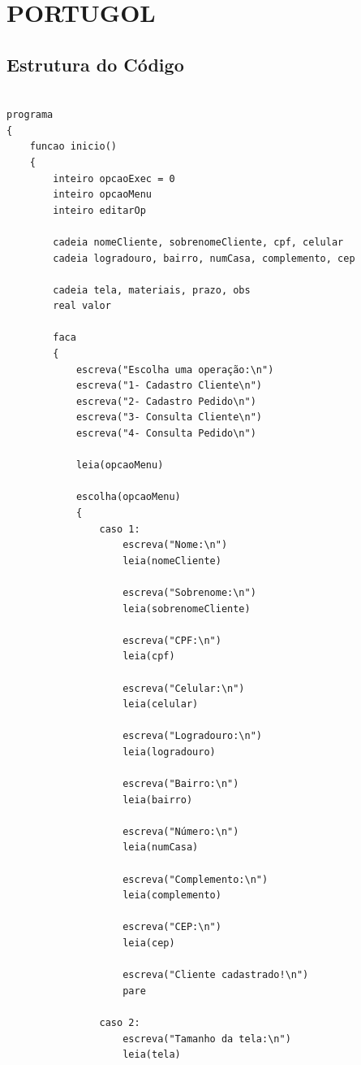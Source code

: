 \chapter{PORTUGOL}
\section{Estrutura do Código}
\begin{lstlisting}[caption={Clasee programa em Portugol}, label={lst:programa_portugol}]

programa
{
    funcao inicio()
    {
        inteiro opcaoExec = 0
        inteiro opcaoMenu
        inteiro editarOp

        cadeia nomeCliente, sobrenomeCliente, cpf, celular
        cadeia logradouro, bairro, numCasa, complemento, cep

        cadeia tela, materiais, prazo, obs
        real valor

        faca
        {
            escreva("Escolha uma operação:\n")
            escreva("1- Cadastro Cliente\n")
            escreva("2- Cadastro Pedido\n")
            escreva("3- Consulta Cliente\n")
            escreva("4- Consulta Pedido\n")

            leia(opcaoMenu)

            escolha(opcaoMenu)
            {
                caso 1:
                    escreva("Nome:\n")
                    leia(nomeCliente)

                    escreva("Sobrenome:\n")
                    leia(sobrenomeCliente)

                    escreva("CPF:\n")
                    leia(cpf)

                    escreva("Celular:\n")
                    leia(celular)

                    escreva("Logradouro:\n")
                    leia(logradouro)

                    escreva("Bairro:\n")
                    leia(bairro)

                    escreva("Número:\n")
                    leia(numCasa)

                    escreva("Complemento:\n")
                    leia(complemento)

                    escreva("CEP:\n")
                    leia(cep)

                    escreva("Cliente cadastrado!\n")
                    pare

                caso 2:
                    escreva("Tamanho da tela:\n")
                    leia(tela)


\end{lstlisting}
